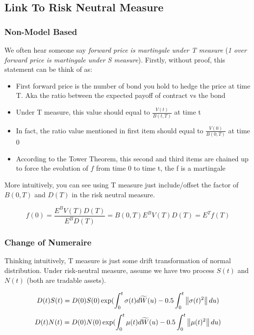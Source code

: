 \subsection{Link To Risk Neutral Measure}
\subsubsection{Non-Model Based}

We often hear someone say {\color{red}\textit{forward price is martingale under T measure}} ({\color{blue}\textit{1 over forward price is martingale under S measure})}.  Firstly, without proof, this statement can be think of as:
\begin{itemize}
\item First forward price is the number of bond you hold to hedge the price at time T. Aka the ratio between the expected payoff of contract vs the bond
\item Under T measure, this value should equal to $\frac{V(t)}{B(t, T)}$ at time t
\item In fact, the ratio value mentioned in first item should equal to $\frac{V(0)}{B(0, T)} $ at time 0
\item According to the {\color{red}Tower Theorem, this second and third items are chained up to force the evolution of $f$ from time 0 to time t, the f is a martingale}
\end{itemize}

More intuitively, you can see using T measure just include/offset the factor of $B(0, T)$ and $D(T)$ in the risk neutral measure.

\begin{equation}
  f(0) = \frac{E^{B} V(T) D(T)}{E^BD(T)} = B(0, T)E^{B} V(T) D(T) =  E^{T}f(T)
\end{equation}


\subsubsection{Change of Numeraire}
Thinking intuitively, T measure is just some drift transformation of normal distribution. Under risk-neutral measure, assume we have two process $S(t)$ and $N(t)$ (both are tradable assets).

\begin{equation}
  D(t)S(t) = D(0) S(0) \exp(\int_{0}^{t} \sigma(t) d\widetilde{W}(u) - 0.5\int_{0} ^ {t} \left\lVert\sigma(t) ^ 2\right\rVert du)
\end{equation}
\begin{equation}
  D(t)N(t) = D(0) N(0) \exp(\int_{0}^{t} \mu(t) d\widetilde{W}(u) - 0.5\int_{0} ^ {t} \left\lVert\mu(t) ^ 2\right\rVert du)
\end{equation}

